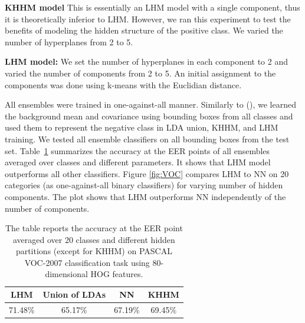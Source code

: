 \documentclass[twoside,11pt]{article}
\begin{document}
\noindent\textbf{KHHM model} This is essentially an LHM model with a single component, thus it is theoretically inferior to LHM. However, we ran this experiment to test the benefits of modeling the hidden structure of the positive class. We varied the number of hyperplanes from 2 to 5.

\noindent\textbf{LHM model:} We set the number of hyperplanes in each component to 2 and varied the number of components from 2 to 5. An initial assignment to the components was done using k-means with the Euclidian distance.

All ensembles were trained in one-against-all manner. Similarly to (\cite{Deva,OsadchyKF12}), we learned the background mean and covariance using bounding boxes from all classes and used them to represent the negative class in LDA union, KHHM, and LHM training. We tested all ensemble classifiers on all bounding boxes from the test set. Table~\ref{tab:VOC} summarizes the accuracy at the EER points of all ensembles averaged over classes and different parameters. It shows that LHM model outperforms all other classifiers. Figure \ref{fig:VOC} compares LHM to NN on 20 categories (as one-against-all binary classifiers) for varying number of hidden components. The plot shows that LHM outperforms NN independently of the number of components.

\begin{table}
\center
\begin{tabular}{|c|c|c|c|}
\hline
 LHM & Union of LDAs & NN & KHHM\\
  \hline
   71.48\%& 65.17\% &67.19\%&69.45\% \\
\hline
\end{tabular}
\caption{The table reports the accuracy at the EER point averaged over 20 classes and different hidden partitions (except for KHHM) on PASCAL VOC-2007 classification task using 80-dimensional HOG features.}\label{tab:VOC}
\end{table}
\end{document}
